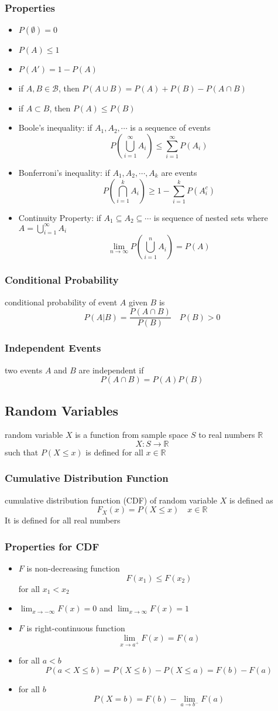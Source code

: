 \documentclass[11pt]{article}
\newcommand{\R}{{\mathbb{R}}}
\newcommand{\mB}{\mathcal{B}}
\newcommand{\ds}{\displaystyle}
\begin{document}
\subsubsection{Properties}
\begin{itemize}
    \item $P(\emptyset)=0$
    \item $P(A)\leq 1$
    \item $P(A')=1-P(A)$
    \item if $A,B\in\mB$, then $P(A\cup B) = P(A)+P(B)-P(A\cap B)$
    \item if $A\subset B$, then $P(A)\leq P(B)$
    \item Boole's inequality: if $A_1,A_2,\cdots$ is a sequence of events \[P(\bigcup_{i=1}^{\infty}A_i)\leq\sum_{i=1}^{\infty}P(A_i)\]
    \item Bonferroni's inequality: if $A_1,A_2,\cdots,A_k$ are events \[P(\bigcap_{i=1}^{k}A_i)\geq1-\sum_{i=1}^{k}P(A_i^c)\]
    \item Continuity Property: if $A_1\subseteq A_2\subseteq\cdots$ is sequence of nested sets where $A=\bigcup_{i=1}^{\infty}A_i$ \[\lim_{n\to\infty}P(\bigcup_{i=1}^{n}A_i)=P(A)\]
\end{itemize}
\subsubsection{Conditional Probability}
conditional probability of event $A$ given $B$ is 
\[P(A|B) = \frac{P(A\cap B)}{P(B)}\quad P(B)>0\]
\subsubsection{Independent Events}
two events $A$ and $B$ are independent if \[P(A\cap B) = P(A)P(B)\] 
\subsection{Random Variables}
random variable $X$ is a function from sample space $S$ to real numbers $\R$ \[X:S\rightarrow\R\]
such that $P(X\leq x)$ is defined for all $x\in\R$
\subsubsection{Cumulative Distribution Function}
cumulative distribution function (CDF) of random variable $X$ is defined as 
\[F_X(x) = P(X\leq x)\quad x\in\R\]
It is defined for all real numbers 
\subsubsection{Properties for CDF}
\begin{itemize}
    \item $F$ is non-decreasing function \[F(x_1)\leq F(x_2)\] for all $x_1<x_2$
    \item $\ds\lim_{x\to-\infty}F(x)=0$ and $\ds\lim_{x\to\infty}F(x)=1$
    \item $F$ is right-continuous function \[\lim_{x\to a^+}F(x)=F(a)\]
    \item for all $a<b$ \[P(a<X\leq b)=P(X\leq b)-P(X\leq a) = F(b) - F(a)\]
    \item for all $b$ \[P(X=b) = F(b) - \lim_{a\to b^-}F(a)\]
\end{itemize}
\end{document}
